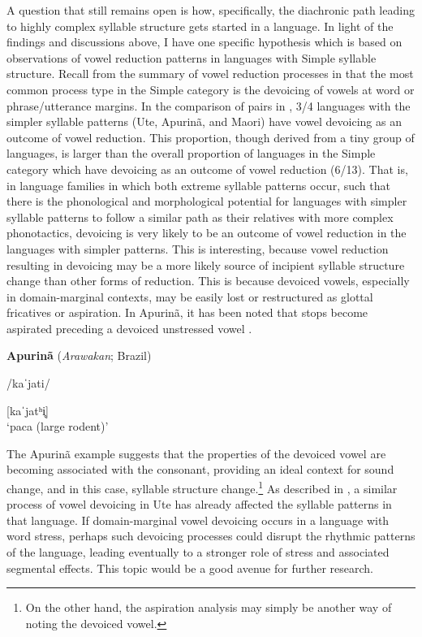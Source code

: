   A question that still remains open is how, specifically, the diachronic path leading to highly complex syllable structure gets started in a language. In light of the findings and discussions above, I have one specific hypothesis which is based on observations of vowel reduction patterns in languages with Simple syllable structure. Recall from the summary of vowel reduction processes in  that the most common process type in the Simple category is the devoicing of vowels at word or phrase/utterance margins. In the comparison of pairs in , 3/4 languages with the simpler syllable patterns (Ute, Apurinã, and Maori) have vowel devoicing as an outcome of vowel reduction. This proportion, though derived from a tiny group of languages, is larger than the overall proportion of languages in the Simple category which have devoicing as an outcome of vowel reduction (6/13). That is, in language families in which both extreme syllable patterns occur, such that there is the phonological and morphological potential for languages with simpler syllable patterns to follow a similar path as their relatives with more complex phonotactics, devoicing is very likely to be an outcome of vowel reduction in the languages with simpler patterns. This is interesting, because vowel reduction resulting in devoicing may be a more likely source of incipient syllable structure change than other forms of reduction. This is because devoiced vowels, especially in domain-marginal contexts, may be easily lost or restructured as glottal fricatives or aspiration. In Apurinã, it has been noted that stops become aspirated preceding a devoiced unstressed vowel .

\ea\label{ex:8.6}
  \textbf{Apurinã} (\textit{Arawakan}; Brazil)

/kaˈjati/

[kaˈjatʰi̥]\\
\glt ‘paca (large rodent)’
\citep[60-1]{Facundes2000} 
\z

  The Apurinã example suggests that the properties of the devoiced vowel are becoming associated with the consonant, providing an ideal context for sound change, and in this case, syllable structure change.\footnote{{On the other hand, the aspiration analysis may simply be another way of noting the devoiced vowel.}} As described in , a similar process of vowel devoicing in Ute has already affected the syllable patterns in that language. If domain-marginal vowel devoicing occurs in a language with word stress, perhaps such devoicing processes could disrupt the rhythmic patterns of the language, leading eventually to a stronger role of stress and associated segmental effects. This topic would be a good avenue for further research.

